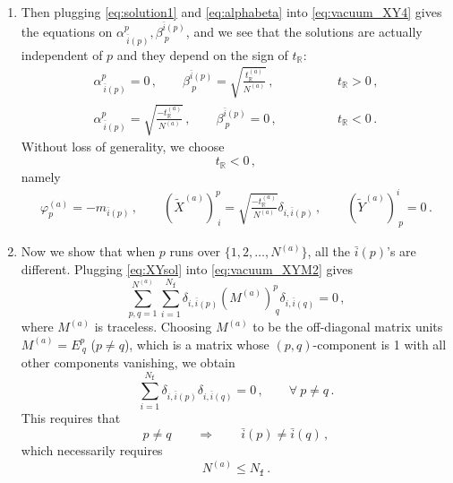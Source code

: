 \documentclass[12pt,a4paper]{article}
\renewcommand{\(}{\left(}
\renewcommand{\)}{\right)}
\renewcommand{\(}{\left(}
\renewcommand{\)}{\right)}
\begin{document}
\begin{enumerate}
\item Then plugging \eqref{eq:solution1} and \eqref{eq:alphabeta} into \eqref{eq:vacuum_XY4} gives the equations on $\alpha^{p}_{\ \bar{i}(p)},\beta^{\bar{i}(p)}_{\ p}$, and we see that the solutions are actually independent of $p$ and they  
depend on the sign of $t_{\mathbb{R}}$:
\begin{equation}
\begin{aligned}
\alpha^{p}_{\ \bar{i}(p)}=0\,, \qquad 
\beta^{\bar{i}(p)}_{\ p}=\sqrt{\frac{t^{(a)}_\mathbb{R}}{N^{(a)}}}\,,&\qquad \qquad t_{\mathbb{R}}> 0 \,, \\
\alpha^{p}_{\ \bar{i}(p)}=\sqrt{\frac{-t^{(a)}_\mathbb{R}}{N^{(a)}}}\,, \qquad 
\beta^{\bar{i}(p)}_{\ p}=0\,,&\qquad \qquad t_{\mathbb{R}}< 0\,.
\end{aligned}
\end{equation}
Without loss of generality, we choose 
\begin{equation}\label{eq:tRnegative}
t_{\mathbb{R}}< 0\,,    
\end{equation}
namely
\begin{equation}\label{eq:XYsol}
\begin{aligned}
\varphi^{(a)}_p=-m_{\bar{i}(p)}
\,, \qquad
(\tilde{X}^{(a)})^p_{\ i}=\sqrt{\frac{-t^{(a)}_\mathbb{R}}{N^{(a)}}}\delta_{i,\bar{i}(p)}
\,, \qquad 
(\tilde{Y}^{(a)})^i_{\ p}=0\,. 
\end{aligned}
\end{equation}
\item Now we show that when $p$ runs over $\{1,2,\dots,N^{(a)}\}$, all the $\bar{i}(p)$'s  are different.
Plugging \eqref{eq:XYsol} into \eqref{eq:vacuum_XYM2} gives
\begin{equation}
\sum_{p,q=1}^{N^{(a)}}\sum_{i=1}^{N_\mathtt{f}}\delta_{i,\bar{i}(p)} (M^{(a)})^p_{\ q} \delta_{i,\bar{i}(q)} =0\,,    
\end{equation}
where $M^{(a)}$ is traceless. 
Choosing $M^{(a)}$ to be the off-diagonal matrix units  $M^{(a)}=E^p_{\ q}$ ($p\neq q$), which is a matrix whose $(p,q)$-component is 1 with all other components vanishing, we obtain
\begin{equation}
\sum_{i=1}^{N_\mathtt{f}}
\delta_{i,\bar{i}(p)}\delta_{i,\bar{i}(q)} =0\,,   
\qquad \forall \ p\neq q\,.
\end{equation}
This requires that  
\begin{equation}\label{eq:baripq}
p\neq q 
\qquad \Longrightarrow \qquad
\bar{i}(p) \neq \bar{i}(q) \,,
\end{equation}
which necessarily requires
\begin{equation}\label{eq:NaNf}
N^{(a)}\leq N_{\mathtt{f}}\,.  
\end{equation}


\end{enumerate}
\end{document}
